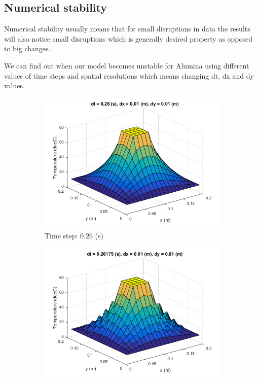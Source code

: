 \documentclass[12pt]{article}
\begin{document}
\subsection{Numerical stability}
Numerical stability usually means that for small disruptions in data the results will also notice small disruptions which is generally desired property as opposed to big changes.

We can find out when our model becomes unstable for Alumina using different values of time steps and spatial resolutions which means changing dt, dx and dy values.

\begin{figure}[H]
	\centering
	\begin{subfigure}[b]{0.475\textwidth}
		\centering
		\includegraphics[width=\textwidth]{s_026}
		{{\small Time step: 0.26 (s)}}    
	\end{subfigure}
	\hfill
	\begin{subfigure}[b]{0.475\textwidth}  
		\centering 
		\includegraphics[width=\textwidth]{s_026175}

\end{subfigure}
\end{figure}
\end{document}
